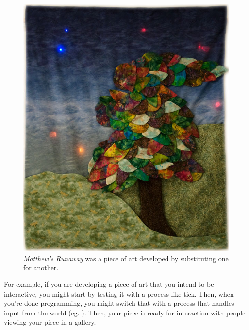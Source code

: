 \begin{figure}
		\vspace{-8mm}
	  \begin{center}
    	\includegraphics[width=0.9\linewidth]{images/matthews-runaway-small}
		  \captionsetup{labelformat=empty, font=footnotesize}
			\caption{{\em Matthew's Runaway} was a piece of art developed by substituting one {\PROCedure} for another.}
  \end{center}
\end{figure}

For example, if you are developing a piece of art that you intend to be interactive, you might start by testing it with a process like {\code tick}. Then, when you're done programming, you might switch that with a process that handles input from the world (eg. \bp). Then, your piece is ready for interaction with people viewing your piece in a gallery.